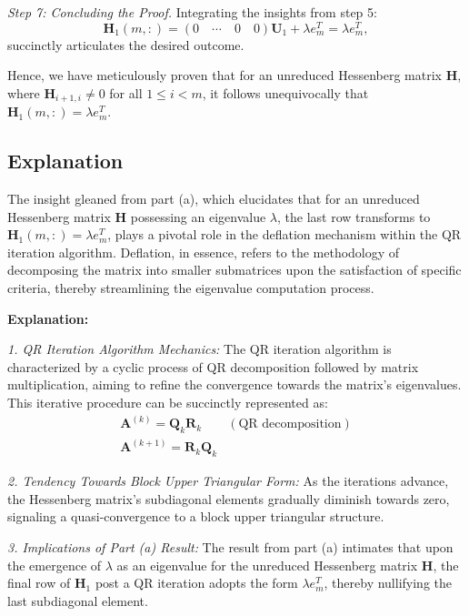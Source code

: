 \documentclass{article}
\begin{document}
\textit{Step 7: Concluding the Proof.}
Integrating the insights from step 5:
\begin{equation}
\boldsymbol{H}_1(m,:) = \left(0 \quad \cdots \quad 0 \quad 0\right) \boldsymbol{U}_1 + \lambda e_m^T = \lambda e_m^T,
\end{equation}
succinctly articulates the desired outcome.

Hence, we have meticulously proven that for an unreduced Hessenberg matrix $\boldsymbol{H}$, where $\boldsymbol{H}_{i+1, i} \neq 0$ for all $1 \leq i < m$, it follows unequivocally that $\boldsymbol{H}_1(m,:) = \lambda e_m^T$.

\subsection*{Explanation}
The insight gleaned from part (a), which elucidates that for an unreduced Hessenberg matrix $\boldsymbol{H}$ possessing an eigenvalue $\lambda$, the last row transforms to $\boldsymbol{H}_1(m,:) = \lambda e_m^T$, plays a pivotal role in the deflation mechanism within the QR iteration algorithm. Deflation, in essence, refers to the methodology of decomposing the matrix into smaller submatrices upon the satisfaction of specific criteria, thereby streamlining the eigenvalue computation process.

\textbf{Explanation:}

\textit{1. QR Iteration Algorithm Mechanics:}
The QR iteration algorithm is characterized by a cyclic process of QR decomposition followed by matrix multiplication, aiming to refine the convergence towards the matrix's eigenvalues. This iterative procedure can be succinctly represented as:
\begin{equation}
\begin{aligned}
\boldsymbol{A}^{(k)} = \boldsymbol{Q}_k \boldsymbol{R}_k \quad &(\text{QR decomposition}) \\
\boldsymbol{A}^{(k+1)} = \boldsymbol{R}_k \boldsymbol{Q}_k &
\end{aligned}
\end{equation}

\textit{2. Tendency Towards Block Upper Triangular Form:}
As the iterations advance, the Hessenberg matrix's subdiagonal elements gradually diminish towards zero, signaling a quasi-convergence to a block upper triangular structure.

\textit{3. Implications of Part (a) Result:}
The result from part (a) intimates that upon the emergence of $\lambda$ as an eigenvalue for the unreduced Hessenberg matrix $\boldsymbol{H}$, the final row of $\boldsymbol{H}_1$ post a QR iteration adopts the form $\lambda e_m^T$, thereby nullifying the last subdiagonal element.
\end{document}
